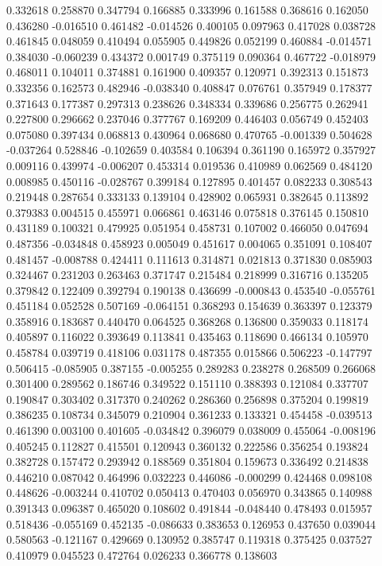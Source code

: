 0.332618
0.258870
0.347794
0.166885
0.333996
0.161588
0.368616
0.162050
0.436280
-0.016510
0.461482
-0.014526
0.400105
0.097963
0.417028
0.038728
0.461845
0.048059
0.410494
0.055905
0.449826
0.052199
0.460884
-0.014571
0.384030
-0.060239
0.434372
0.001749
0.375119
0.090364
0.467722
-0.018979
0.468011
0.104011
0.374881
0.161900
0.409357
0.120971
0.392313
0.151873
0.332356
0.162573
0.482946
-0.038340
0.408847
0.076761
0.357949
0.178377
0.371643
0.177387
0.297313
0.238626
0.348334
0.339686
0.256775
0.262941
0.227800
0.296662
0.237046
0.377767
0.169209
0.446403
0.056749
0.452403
0.075080
0.397434
0.068813
0.430964
0.068680
0.470765
-0.001339
0.504628
-0.037264
0.528846
-0.102659
0.403584
0.106394
0.361190
0.165972
0.357927
0.009116
0.439974
-0.006207
0.453314
0.019536
0.410989
0.062569
0.484120
0.008985
0.450116
-0.028767
0.399184
0.127895
0.401457
0.082233
0.308543
0.219448
0.287654
0.333133
0.139104
0.428902
0.065931
0.382645
0.113892
0.379383
0.004515
0.455971
0.066861
0.463146
0.075818
0.376145
0.150810
0.431189
0.100321
0.479925
0.051954
0.458731
0.107002
0.466050
0.047694
0.487356
-0.034848
0.458923
0.005049
0.451617
0.004065
0.351091
0.108407
0.481457
-0.008788
0.424411
0.111613
0.314871
0.021813
0.371830
0.085903
0.324467
0.231203
0.263463
0.371747
0.215484
0.218999
0.316716
0.135205
0.379842
0.122409
0.392794
0.190138
0.436699
-0.000843
0.453540
-0.055761
0.451184
0.052528
0.507169
-0.064151
0.368293
0.154639
0.363397
0.123379
0.358916
0.183687
0.440470
0.064525
0.368268
0.136800
0.359033
0.118174
0.405897
0.116022
0.393649
0.113841
0.435463
0.118690
0.466134
0.105970
0.458784
0.039719
0.418106
0.031178
0.487355
0.015866
0.506223
-0.147797
0.506415
-0.085905
0.387155
-0.005255
0.289283
0.238278
0.268509
0.266068
0.301400
0.289562
0.186746
0.349522
0.151110
0.388393
0.121084
0.337707
0.190847
0.303402
0.317370
0.240262
0.286360
0.256898
0.375204
0.199819
0.386235
0.108734
0.345079
0.210904
0.361233
0.133321
0.454458
-0.039513
0.461390
0.003100
0.401605
-0.034842
0.396079
0.038009
0.455064
-0.008196
0.405245
0.112827
0.415501
0.120943
0.360132
0.222586
0.356254
0.193824
0.382728
0.157472
0.293942
0.188569
0.351804
0.159673
0.336492
0.214838
0.446210
0.087042
0.464996
0.032223
0.446086
-0.000299
0.424468
0.098108
0.448626
-0.003244
0.410702
0.050413
0.470403
0.056970
0.343865
0.140988
0.391343
0.096387
0.465020
0.108602
0.491844
-0.048440
0.478493
0.015957
0.518436
-0.055169
0.452135
-0.086633
0.383653
0.126953
0.437650
0.039044
0.580563
-0.121167
0.429669
0.130952
0.385747
0.119318
0.375425
0.037527
0.410979
0.045523
0.472764
0.026233
0.366778
0.138603

